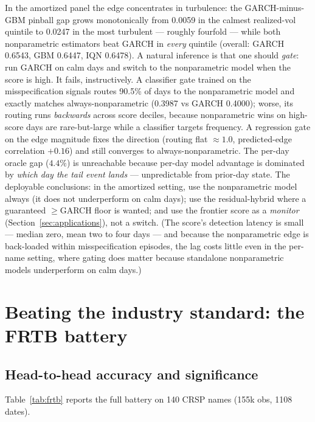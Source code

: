 \documentclass[11pt]{article}
\theoremstyle{remark}
\begin{document}
In the amortized panel the edge concentrates in turbulence: the
GARCH-minus-GBM pinball gap grows monotonically from 0.0059 in the
calmest realized-vol quintile to 0.0247 in the most turbulent ---
roughly fourfold --- while both nonparametric estimators beat GARCH in
\emph{every} quintile (overall: GARCH 0.6543, GBM 0.6447, IQN 0.6478).
A natural inference is that one should \emph{gate}: run GARCH on calm
days and switch to the nonparametric model when the score is high. It
fails, instructively. A classifier gate trained on the misspecification
signals routes 90.5\% of days to the nonparametric model and exactly
matches always-nonparametric (0.3987 vs GARCH 0.4000); worse, its
routing runs \emph{backwards} across score deciles, because nonparametric
wins on high-score days are rare-but-large while a classifier targets
frequency. A regression gate on the edge magnitude fixes the direction
(routing flat $\approx 1.0$, predicted-edge correlation $+0.16$) and
still converges to always-nonparametric. The per-day oracle gap
($4.4\%$) is unreachable because per-day model advantage is dominated by
\emph{which day the tail event lands} --- unpredictable from prior-day
state. The deployable conclusions: in the amortized setting, use the
nonparametric model always (it does not underperform on calm days); use
the residual-hybrid where a guaranteed $\ge$GARCH floor is wanted; and
use the frontier score as a \emph{monitor} (Section~\ref{sec:applications}),
not a switch. (The score's detection latency is small --- median zero,
mean two to four days --- and because the nonparametric edge is
back-loaded within misspecification episodes, the lag costs little even
in the per-name setting, where gating does matter because standalone
nonparametric models underperform on calm days.)

\section{Beating the industry standard: the FRTB battery}\label{sec:frtb}

\subsection{Head-to-head accuracy and significance}

Table~\ref{tab:frtb} reports the full battery on 140 CRSP names
(155k obs, 1108 dates).
\end{document}
